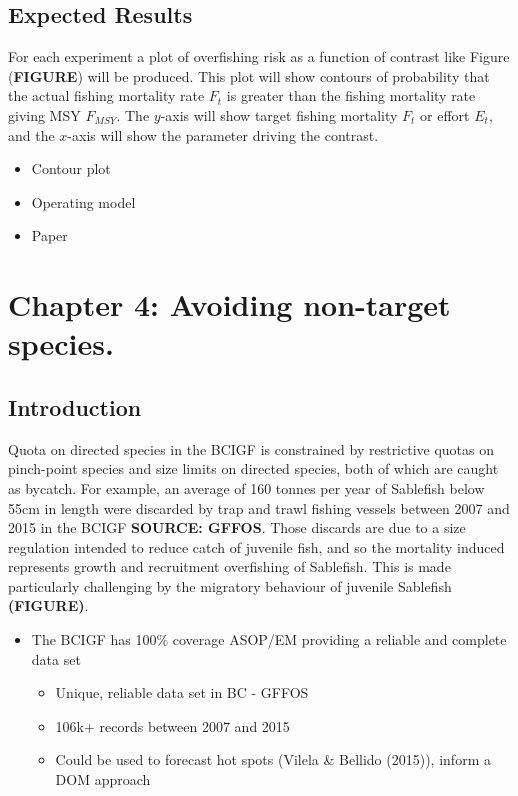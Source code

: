 \documentclass[12pt,]{scrartcl}
\providecommand{\tightlist}{%
  \setlength{\itemsep}{0pt}\setlength{\parskip}{0pt}}
\begin{document}
\subsection{Expected Results}\label{expected-results-2}

For each experiment a plot of overfishing risk as a function of contrast
like Figure (\textbf{FIGURE}) will be produced. This plot will show
contours of probability that the actual fishing mortality rate \(F_t\)
is greater than the fishing mortality rate giving MSY \(F_{MSY}\). The
\(y\)-axis will show target fishing mortality \(F_t\) or effort \(E_t\),
and the \(x\)-axis will show the parameter driving the contrast.

\begin{itemize}
\tightlist
\item
  Contour plot
\item
  Operating model
\item
  Paper
\end{itemize}

\section{Chapter 4: Avoiding non-target
species.}\label{chapter-4-avoiding-non-target-species.}

\subsection{Introduction}\label{introduction-1}

Quota on directed species in the BCIGF is constrained by restrictive
quotas on pinch-point species and size limits on directed species, both
of which are caught as bycatch. For example, an average of 160 tonnes
per year of Sablefish below 55cm in length were discarded by trap and
trawl fishing vessels between 2007 and 2015 in the BCIGF \textbf{SOURCE:
GFFOS}. Those discards are due to a size regulation intended to reduce
catch of juvenile fish, and so the mortality induced represents growth
and recruitment overfishing of Sablefish. This is made particularly
challenging by the migratory behaviour of juvenile Sablefish
\textbf{(FIGURE)}.

\begin{itemize}
\tightlist
\item
  The BCIGF has 100\% coverage ASOP/EM providing a reliable and complete
  data set

  \begin{itemize}
  \tightlist
  \item
    Unique, reliable data set in BC - GFFOS
  \item
    106k+ records between 2007 and 2015
  \item
    Could be used to forecast hot spots (Vilela \& Bellido (2015)),
    inform a DOM approach
  \end{itemize}
\end{itemize}
\end{document}
